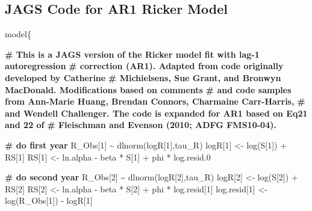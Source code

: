 \documentclass[french,11pt]{book}
\newenvironment{Shaded}{\begin{snugshade}}{\end{snugshade}}
\newcommand{\CommentTok}[1]{\textcolor[rgb]{0.56,0.35,0.01}{\textbf{#1}}}
\newcommand{\DecValTok}[1]{\textcolor[rgb]{0.00,0.00,0.81}{#1}}
\newcommand{\FloatTok}[1]{\textcolor[rgb]{0.00,0.00,0.81}{#1}}
\newcommand{\FunctionTok}[1]{\textcolor[rgb]{0.00,0.00,0.00}{#1}}
\newcommand{\NormalTok}[1]{#1}
\newcommand{\OtherTok}[1]{\textcolor[rgb]{0.56,0.35,0.01}{#1}}
\newcommand{\SpecialCharTok}[1]{\textcolor[rgb]{0.00,0.00,0.00}{#1}}
\begin{document}
\subsection{JAGS Code for AR1 Ricker Model}\label{jags-code-for-ar1-ricker-model}
\begin{Shaded}
\begin{Highlighting}[]
\NormalTok{model\{}

\CommentTok{\# This is a JAGS version of the Ricker model fit with lag{-}1 autoregression }
\CommentTok{\# correction (AR1). Adapted from code originally developed by Catherine }
\CommentTok{\# Michielsens, Sue Grant, and Bronwyn MacDonald. Modifications based on comments}
\CommentTok{\# and code samples from Ann{-}Marie Huang, Brendan Connors, Charmaine Carr{-}Harris, }
\CommentTok{\# and Wendell Challenger. The code is expanded for AR1 based on Eq21 and 22 of  }
\CommentTok{\# Fleischman and Evenson (2010; ADFG FMS10{-}04). }

\CommentTok{\# do first year    }
\NormalTok{R\_Obs[}\DecValTok{1}\NormalTok{] }\SpecialCharTok{\textasciitilde{}} \FunctionTok{dlnorm}\NormalTok{(logR[}\DecValTok{1}\NormalTok{],tau\_R)    }
\NormalTok{logR[}\DecValTok{1}\NormalTok{] }\OtherTok{\textless{}{-}} \FunctionTok{log}\NormalTok{(S[}\DecValTok{1}\NormalTok{]) }\SpecialCharTok{+}\NormalTok{ RS[}\DecValTok{1}\NormalTok{]    }
\NormalTok{RS[}\DecValTok{1}\NormalTok{] }\OtherTok{\textless{}{-}}\NormalTok{ ln.alpha }\SpecialCharTok{{-}}\NormalTok{ beta }\SpecialCharTok{*}\NormalTok{ S[}\DecValTok{1}\NormalTok{] }\SpecialCharTok{+}\NormalTok{ phi }\SpecialCharTok{*}\NormalTok{ log.resid}\FloatTok{.0}    

\CommentTok{\# do second year    }
\NormalTok{R\_Obs[}\DecValTok{2}\NormalTok{] }\SpecialCharTok{\textasciitilde{}} \FunctionTok{dlnorm}\NormalTok{(logR[}\DecValTok{2}\NormalTok{],tau\_R)    }
\NormalTok{logR[}\DecValTok{2}\NormalTok{] }\OtherTok{\textless{}{-}} \FunctionTok{log}\NormalTok{(S[}\DecValTok{2}\NormalTok{]) }\SpecialCharTok{+}\NormalTok{ RS[}\DecValTok{2}\NormalTok{]     }
\NormalTok{RS[}\DecValTok{2}\NormalTok{] }\OtherTok{\textless{}{-}}\NormalTok{ ln.alpha }\SpecialCharTok{{-}}\NormalTok{ beta }\SpecialCharTok{*}\NormalTok{ S[}\DecValTok{2}\NormalTok{] }\SpecialCharTok{+}\NormalTok{ phi }\SpecialCharTok{*}\NormalTok{ log.resid[}\DecValTok{1}\NormalTok{]    }
\NormalTok{log.resid[}\DecValTok{1}\NormalTok{] }\OtherTok{\textless{}{-}}  \FunctionTok{log}\NormalTok{(R\_Obs[}\DecValTok{1}\NormalTok{]) }\SpecialCharTok{{-}}\NormalTok{ logR[}\DecValTok{1}\NormalTok{]    }


\end{Highlighting}
\end{Shaded}
\end{document}
